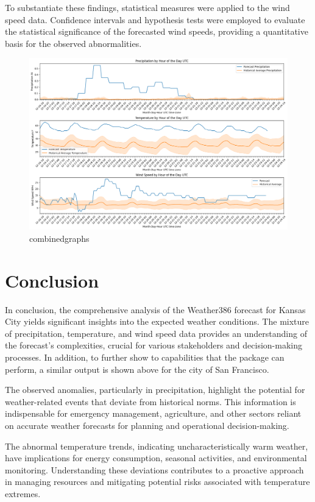 \documentclass[conference]{IEEEtran}
\begin{document}
    To substantiate these findings, statistical measures were applied to the wind speed data. Confidence intervals and hypothesis tests were employed to evaluate the statistical significance of the forecasted wind speeds, providing a quantitative basis for the observed abnormalities.
    
\begin{figure}[htbp]
    \centering
    \includegraphics[width=\textwidth]{san_fran.png}
    \caption{combined\textunderscore graphs}
    \label{fig:San Francisco}
\end{figure}

\section{Conclusion}
    In conclusion, the comprehensive analysis of the Weather386 forecast for Kansas City yields significant insights into the expected weather conditions. The mixture of precipitation, temperature, and wind speed data provides an understanding of the forecast's complexities, crucial for various stakeholders and decision-making processes. In addition, to further show to capabilities that the package can perform, a similar output is shown above for the city of San Francisco. 

    The observed anomalies, particularly in precipitation, highlight the potential for weather-related events that deviate from historical norms. This information is indispensable for emergency management, agriculture, and other sectors reliant on accurate weather forecasts for planning and operational decision-making.

    The abnormal temperature trends, indicating uncharacteristically warm weather, have implications for energy consumption, seasonal activities, and environmental monitoring. Understanding these deviations contributes to a proactive approach in managing resources and mitigating potential risks associated with temperature extremes.
\end{document}
